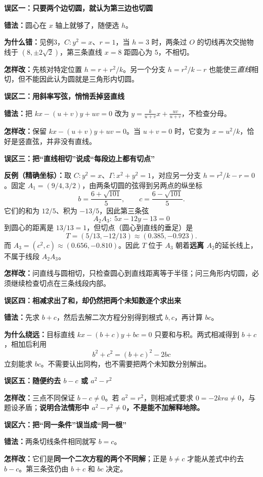\clearpage
\begin{trapbox}
\textbf{误区一：只要两个边切圆，就认为第三边也切圆}

\textbf{错法：}圆心在 $x$ 轴上就够了，随便选 $h$。

\textbf{为什么错：}见例3，$C:y^2=x$、$r=1$，当 $h=3$ 时，两条过 $O$ 的切线再次交抛物线于 $(8,\pm2\sqrt2)$，第三条直线 $x=8$ 距圆心为 $5$，不相切。

\textbf{怎样改：}先核对特定位置 $h=r+r^2/k$。另一个分支 $h=r^2/k-r$ 也能使三\emph{直线}相切，但不能因此认为圆就是三角形内切圆。

\medskip
\textbf{误区二：用斜率写弦，悄悄丢掉竖直线}

\textbf{错法：}把 $kx-(u+v)y+uv=0$ 改为 $y=\frac{k}{u+v}x+\frac{uv}{u+v}$，不检查分母。

\textbf{怎样改：}保留 $kx-(u+v)y+uv=0$。当 $u+v=0$ 时，它变为 $x=u^2/k$，恰好是竖直弦，并非没有直线。
\end{trapbox}

\clearpage
\begin{trapbox}
\textbf{误区三：把“直线相切”说成“每段边上都有切点”}

\textbf{反例（精确坐标）：}取 $C:y^2=x$、$\Gamma:x^2+y^2=1$，对应另一分支 $h=r^2/k-r=0$。固定
$A_1=(9/4,3/2)$，由两条切圆的弦得到另两点的纵坐标
\[
b=\frac{6+\sqrt{101}}5,\qquad c=\frac{6-\sqrt{101}}5.
\]
它们的和为 $12/5$、积为 $-13/5$，因此第三条弦
\[
A_2A_3:\ 5x-12y-13=0
\]
到圆心的距离是 $13/13=1$，但切点（圆心到直线的垂足）是
\[
T=(5/13,-12/13)\approx(0.385,-0.923).
\]
而 $A_3=(c^2,c)\approx(0.656,-0.810)$。因此 $T$ 位于 $A_3$ 朝着\textbf{远离 $A_2$}的延长线上，不属于线段 $A_2A_3$。
\begin{center}

\end{center}
\textbf{怎样改：}问直线与圆相切，只检查圆心到直线距离等于半径；问三角形内切圆，必须继续检查切点在三条线段内部。
\end{trapbox}

\clearpage
\begin{trapbox}
\textbf{误区四：相减求出了和，却仍然把两个未知数逐个求出来}

\textbf{错法：}先求 $b+c$，然后去解二次方程分别得到根式 $b,c$，再计算 $bc$。

\textbf{为什么绕远：}目标直线 $kx-(b+c)y+bc=0$ 只要和与积。两式相减得到 $b+c$，相加后利用
\[
b^2+c^2=(b+c)^2-2bc
\]
立刻能求 $bc$。不需要认出同构，也不需要把两个未知数分别解出。

\medskip
\textbf{误区五：随便约去 $b-c$ 或 $a^2-r^2$}

\textbf{怎样改：}三点不同保证 $b-c\ne0$。若 $a^2=r^2$，则相减式要求 $0=-2kra\ne0$，与题设矛盾；\textbf{说明合法情形中 $a^2-r^2\ne0$，不是能不加解释地除。}

\medskip
\textbf{误区六：把“同一条件”误当成“同一根”}

\textbf{错法：}两条切线条件相同就写 $b=c$。

\textbf{怎样改：}它们是\textbf{同一个二次方程的两个不同解}；正是 $b\ne c$ 才能从差式中约去 $b-c$。第三条弦仍由 $b+c$ 和 $bc$ 决定。
\end{trapbox}
